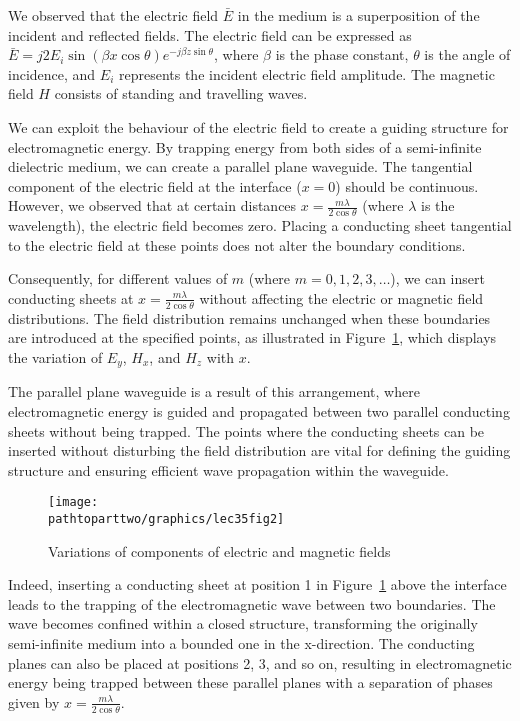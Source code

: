 We observed that the electric field $\bar{E}$ in the medium is a superposition of the incident and reflected fields. The electric field can be expressed as $\bar{E} = j 2E_i\sin(\beta x\cos\theta)e^{-j\beta z\sin\theta}$, where $\beta$ is the phase constant, $\theta$ is the angle of incidence, and $E_i$ represents the incident electric field amplitude. The magnetic field $H$ consists of standing and travelling waves.

We can exploit the behaviour of the electric field to create a guiding structure for electromagnetic energy. By trapping energy from both sides of a semi-infinite dielectric medium, we can create a parallel plane waveguide. The tangential component of the electric field at the interface ($x=0$) should be continuous. However, we observed that at certain distances $x=\frac{m\lambda}{2\cos\theta}$ (where $\lambda$ is the wavelength), the electric field becomes zero. Placing a conducting sheet tangential to the electric field at these points does not alter the boundary conditions.

Consequently, for different values of $m$ (where $m=0, 1, 2, 3, \ldots$), we can insert conducting sheets at $x=\frac{m\lambda}{2\cos\theta}$ without affecting the electric or magnetic field distributions. The field distribution remains unchanged when these boundaries are introduced at the specified points, as illustrated in Figure~\ref{fig:lec35fig2}, which displays the variation of $E_y$, $H_x$, and $H_z$ with $x$.

The parallel plane waveguide is a result of this arrangement, where electromagnetic energy is guided and propagated between two parallel conducting sheets without being trapped. The points where the conducting sheets can be inserted without disturbing the field distribution are vital for defining the guiding structure and ensuring efficient wave propagation within the waveguide.
\begin{figure}[h]
\centering
\texttt{[image: \\pathtoparttwo/graphics/lec35fig2]}
\caption{Variations of components of electric and magnetic fields}
\label{fig:lec35fig2}
\end{figure}

Indeed, inserting a conducting sheet at position 1 in Figure~\ref{fig:lec35fig2} above the interface leads to the trapping of the electromagnetic wave between two boundaries. The wave becomes confined within a closed structure, transforming the originally semi-infinite medium into a bounded one in the x-direction. The conducting planes can also be placed at positions 2, 3, and so on, resulting in electromagnetic energy being trapped between these parallel planes with a separation of phases given by $x=\frac{m\lambda}{2\cos\theta}$.

